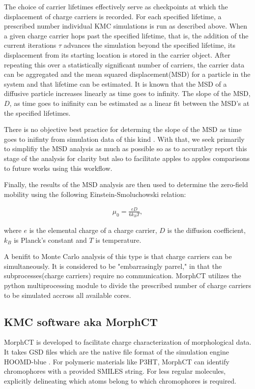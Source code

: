 The choice of carrier lifetimes effectively serve as checkpoints at which the displacement of charge carriers is recorded. For
each specified lifetime, a prescribed number individual KMC simulations is run as described above. When a
given charge carrier hops past the specified lifetime, that is, the addition of the current iterations $\tau$ advances
the simulation beyond the specified lifetime,  its displacement from its starting location is stored in the carrier object. After repeating this over a
statistically significant number of carriers, the carrier data can be aggregated and the mean squared
displacement(MSD) for a particle in the system and that lifetime can be estimated.
It is known that the MSD of a diffusive particle increases linearly as time goes to infinity. 
The slope of the MSD, $D$,  as time
goes to inifinity can be estimated as a linear fit between the MSD's at the specified lifetimes.

There is no objective best practice for determing the slope of the MSD as
time goes to inifinty from simulation data of this kind \cite{Maginn2018}. With that, we seek primarily to simplifiy the MSD analysis as much as
possible so as to accuratley report this stage of the analysis for clarity but also to facilitate apples to
apples comparisons to future works using this workflow. 

Finally, the results of the MSD analysis are then used to determine the zero-field mobility using the following Einstein-Smoluchowski relation:

\begin{align}
    \mu_{0} = \frac{eD}{6k_{B}T},
\end{align}

where $e$ is the elemental charge of a charge carrier, $D$ is the diffusion coefficient, $k_{B}$ is Planck's
constant and $T$ is temperature.  

A benifit to Monte Carlo analysis of this type is that charge carriers can be simultaneously. It is considered
to be "embarrasingly parrel," in that the subprocesses(charge carriers) require no communication.
MorphCT utilizes the python multiprocessing module to divide the prescribed number of charge carriers to be
simulated accross all available cores.  

\subsection{KMC software aka MorphCT}
\label{morph}
MorphCT is developed to facilitate charge characterization of morphological data. It takes GSD files which are
the native file format of the simulation engine HOOMD-blue \cite{Anderson2020a}.
For polymeric materials like P3HT, MorphCT
can identify chromophores with a provided SMILES string. For less regular molecules, explicitly delineating
which atoms belong to which chromophores is required.
